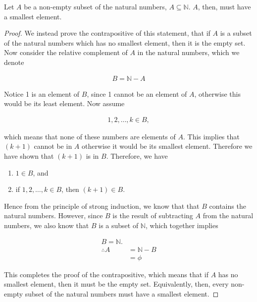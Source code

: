 \documentclass[twoside]{report}
\begin{document}
\vspace{\baselineskip}
\begin{theorem}
	Let $A$ be a non-empty subset of the natural numbers, $A \subseteq \mathbb{N}$. $A$, then, must have a smallest element.
\end{theorem}
\begin{proof}
	We instead prove the contrapositive of this statement, that if $A$ is a subset of the natural numbers which has no smallest element, then it is the empty set. Now consider the relative complement of $A$ in the natural numbers, which we denote
	
	\begin{align*}
		B = \mathbb{N} - A
	\end{align*}
	
	Notice 1 is an element of $B$, since 1 cannot be an element of $A$, otherwise this would be its least element. Now assume
	
	\begin{align*}
		1, 2, \dots, k \in B,
	\end{align*}
	
	which means that none of these numbers are elements of $A$. This implies that $(k + 1)$ cannot be in $A$ otherwise it would be its smallest element. Therefore we have shown that $(k + 1)$ is in $B$. Therefore, we have
	
	\vspace{\baselineskip}
	\begin{enumerate}
		\item $1 \in B$, and
		\item if $1, 2, \dots, k \in B$, then $(k + 1) \in B$.
	\end{enumerate}
	\vspace{\baselineskip}
	
	Hence from the principle of strong induction, we know that that $B$ contains the natural numbers. However, since $B$ is the result of subtracting $A$ from the natural numbers, we also know that $B$ is a subset of $\mathbb{N}$, which together implies
	
	\begin{align*}
		B = \mathbb{N}. \\
		\therefore A &= \mathbb{N} - B \\
		&= \phi
	\end{align*}
	
	This completes the proof of the contrapositive, which means that if $A$ has no smallest element, then it must be the empty set. Equivalently, then, every non-empty subset of the natural numbers must have a smallest element. 
\end{proof}
\vspace{\baselineskip}


\end{document}
